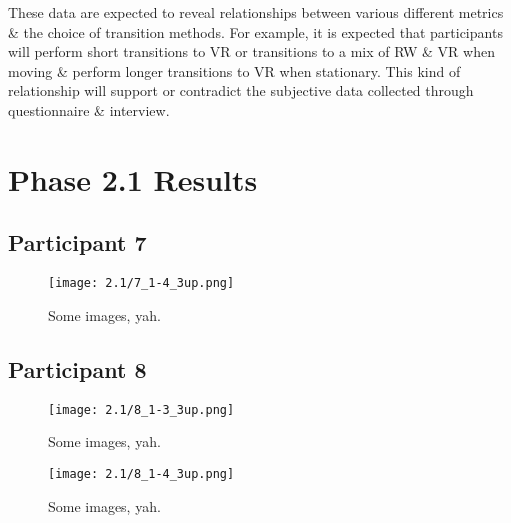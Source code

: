 These data are expected to reveal relationships between various different metrics \& the choice of transition methods. For example, it is expected that participants will perform short transitions to VR or transitions to a mix of RW \& VR when moving \& perform longer transitions to VR when stationary. This kind of relationship will support or contradict the subjective data collected through questionnaire \& interview.

\section{Phase 2.1 Results}


\clearpage

\subsection{Participant 7}

\begin{figure}[h]
	\begin{center}
	\texttt{[image: 2.1/7\_1-4\_3up.png]}
	\caption{Some images, yah.}
	\end{center}
\end{figure}


\clearpage

\subsection{Participant 8}

\begin{figure}[h]
	\begin{center}
	\texttt{[image: 2.1/8\_1-3\_3up.png]}
	\caption{Some images, yah.}
	\end{center}
\end{figure}

\clearpage

\begin{figure}[h]
	\begin{center}
	\texttt{[image: 2.1/8\_1-4\_3up.png]}
	\caption{Some images, yah.}
	\end{center}
\end{figure}

